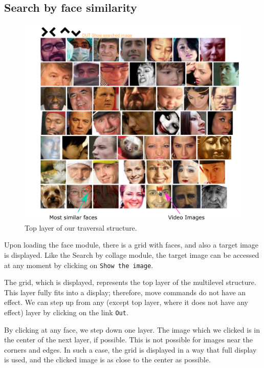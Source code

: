 \subsection{Search by face similarity}

\begin{figure}
    \centering
    \includegraphics[width=\linewidth]{img/face_grid.png}
    \caption{Top layer of our traversal structure.}
    \label{fig:face_grid_app}
\end{figure}

Upon loading the face module, there is a grid with faces, and also a target image is displayed. Like the Search by collage module, the target image can be accessed at any moment by clicking on \verb+Show the image+. 

The grid, which is displayed, represents the top layer of the multilevel structure. This layer fully fits into a display; therefore, move commands do not have an effect. We can step up from any (except top layer, where it does not have any effect) layer by clicking on the link \verb+Out+.

By clicking at any face, we step down one layer. The image which we clicked is in the center of the next layer, if possible. This is not possible for images near the corners and edges. In such a case, the grid is displayed in a way that full display is used, and the clicked image is as close to the center as possible.

